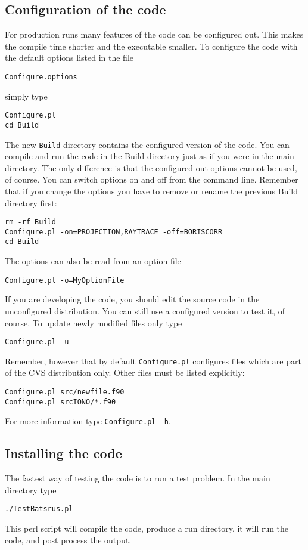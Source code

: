 \subsection{Configuration of the code}

For production runs many features of the code can be configured out.
This makes the compile time shorter and the executable smaller.
To configure the code with the default options listed in the file
\begin{verbatim}
Configure.options
\end{verbatim}
simply type
\begin{verbatim}
Configure.pl
cd Build
\end{verbatim}
The new {\tt Build} directory contains the configured version of the code.
You can compile and run the code in the Build directory just as if you were
in the main directory. The only difference is that the configured out
options cannot be used, of course. You can switch options on and off
from the command line. Remember that if you change the options 
you have to remove or rename the previous Build directory first:
\begin{verbatim}
rm -rf Build
Configure.pl -on=PROJECTION,RAYTRACE -off=BORISCORR
cd Build
\end{verbatim}
The options can also be read from an option file
\begin{verbatim}
Configure.pl -o=MyOptionFile
\end{verbatim}
If you are developing the code, you should edit the source code
in the unconfigured distribution. You can still use a configured
version to test it, of course. To update newly modified files only type
\begin{verbatim}
Configure.pl -u
\end{verbatim}
Remember, however that by default {\tt Configure.pl} configures files 
which are part of the CVS distribution only. Other files must be listed
explicitly:
\begin{verbatim}
Configure.pl src/newfile.f90
Configure.pl srcIONO/*.f90
\end{verbatim}
For more information type {\tt Configure.pl -h}.

\subsection{Installing the code}

The fastest way of testing the code is to run a test problem.
In the main directory type
\begin{verbatim}
./TestBatsrus.pl
\end{verbatim}
This perl script will compile the code, produce a run directory,
it will run the code, and post process the output.

